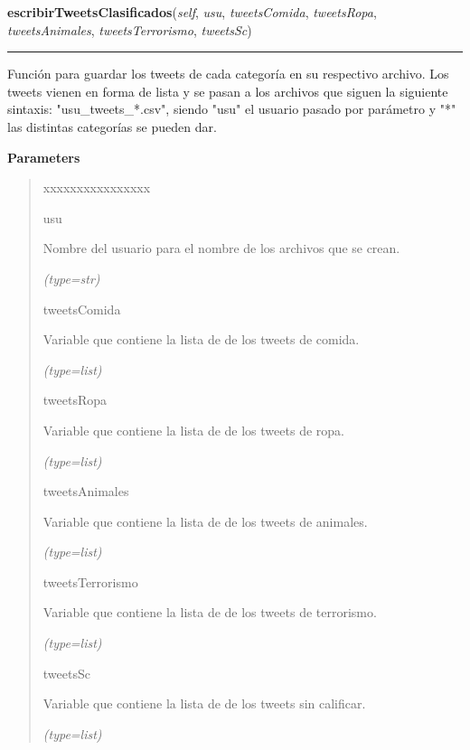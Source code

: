 \hspace{.8\funcindent}\begin{boxedminipage}{\funcwidth}

    \raggedright \textbf{escribirTweetsClasificados}(\textit{self}, \textit{usu}, \textit{tweetsComida}, \textit{tweetsRopa}, \textit{tweetsAnimales}, \textit{tweetsTerrorismo}, \textit{tweetsSc})

    \vspace{-1.5ex}

    \rule{\textwidth}{0.5\fboxrule}
\setlength{\parskip}{2ex}
    Función para guardar los tweets de cada categoría en su respectivo 
    archivo. Los tweets vienen en forma de lista y se pasan a los archivos 
    que siguen la siguiente sintaxis: "usu\_tweets\_*.csv", siendo "usu" el
    usuario pasado por parámetro y "*" las distintas categorías se pueden 
    dar.

\setlength{\parskip}{1ex}
      \textbf{Parameters}
      \vspace{-1ex}

      \begin{quote}
        \begin{Ventry}{xxxxxxxxxxxxxxxx}

          \item[usu]

          Nombre del usuario para el nombre de los archivos que se crean.

            {\it (type=str)}

          \item[tweetsComida]

          Variable que contiene la lista de de los tweets de comida.

            {\it (type=list)}

          \item[tweetsRopa]

          Variable que contiene la lista de de los tweets de ropa.

            {\it (type=list)}

          \item[tweetsAnimales]

          Variable que contiene la lista de de los tweets de animales.

            {\it (type=list)}

          \item[tweetsTerrorismo]

          Variable que contiene la lista de de los tweets de terrorismo.

            {\it (type=list)}

          \item[tweetsSc]

          Variable que contiene la lista de de los tweets sin calificar.

            {\it (type=list)}

        \end{Ventry}

      \end{quote}

    \end{boxedminipage}

